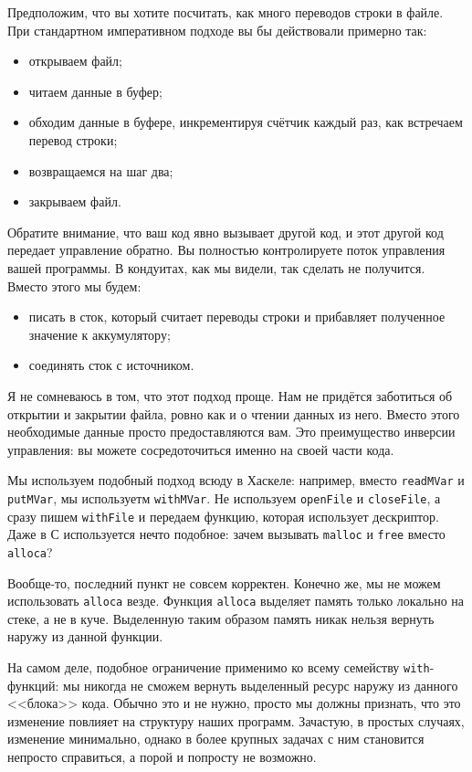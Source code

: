 {Предположим, что вы хотите посчитать, как много переводов строки в файле. При 
стандартном императивном подходе вы бы действовали примерно так:
\begin{itemize}  
\item   открываем файл;
\item   читаем данные в буфер;
\item   обходим данные в буфере, инкрементируя счётчик каждый раз, как встречаем перевод строки;
\item   возвращаемся на шаг два;
\item   закрываем файл.
\end{itemize}
Обратите внимание, что ваш код явно вызывает другой код, и этот другой код 
передает управление обратно. Вы полностью контролируете поток 
управления вашей программы. В кондуитах, как мы видели, так сделать 
не получится. Вместо этого мы будем:
\begin{itemize}
\item  писать в сток, который считает переводы строки и прибавляет полученное значение к аккумулятору;
\item  соединять сток с источником.
\end{itemize} 
Я не сомневаюсь в том, что этот подход проще. Нам не придётся заботиться об 
открытии и закрытии файла, ровно как и о чтении данных из него. Вместо этого необходимые данные 
просто предоставляются вам. Это преимущество инверсии управления: вы 
можете сосредоточиться именно на своей части кода.

Мы используем подобный подход всюду в Хаскеле: например, вместо \lstinline'readMVar' 
и \lstinline'putMVar', мы используетм \lstinline'withMVar'. Не используем 
\lstinline'openFile' и \lstinline'closeFile', а сразу пишем \lstinline'withFile' 
и передаем функцию, которая использует дескриптор. Даже в С используется нечто 
подобное: зачем вызывать \lstinline'malloc' и \lstinline'free' вместо
\lstinline'alloca'?

Вообще-то, последний пункт не совсем корректен. Конечно же, мы не можем использовать 
\lstinline'alloca' везде. Функция \lstinline'alloca' выделяет память только локально на 
стеке, а не в куче. Выделенную таким образом память никак нельзя вернуть наружу из 
данной функции.

На самом деле, подобное ограничение применимо ко всему семейству 
\lstinline{with}-функций: мы никогда не сможем вернуть выделенный ресурс наружу из данного 
<<блока>> кода. Обычно это и не нужно, просто мы должны признать, что это 
изменение повлияет на структуру наших программ. Зачастую, в простых случаях, изменение минимально, однако в более крупных задачах с ним становится непросто справиться,
а порой и попросту не возможно. 

}
